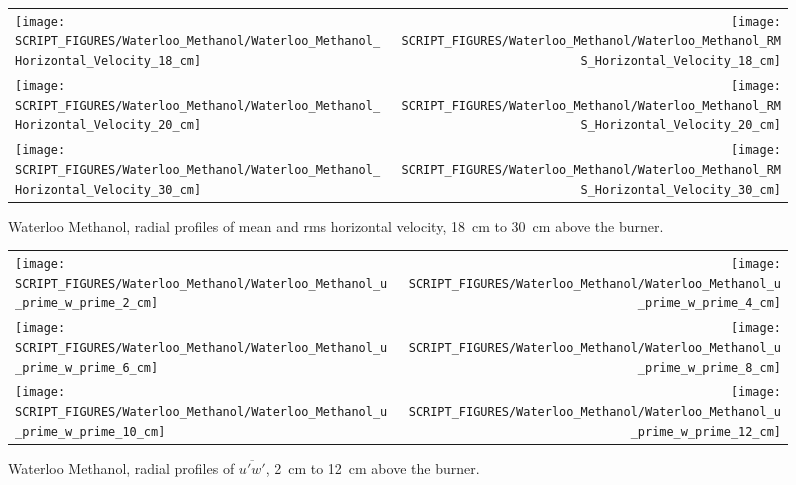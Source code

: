 \begin{figure}[p]
\begin{tabular*}{\textwidth}{l@{\extracolsep{\fill}}r}
\texttt{[image: SCRIPT\_FIGURES/Waterloo\_Methanol/Waterloo\_Methanol\_Horizontal\_Velocity\_18\_cm]} &
\texttt{[image: SCRIPT\_FIGURES/Waterloo\_Methanol/Waterloo\_Methanol\_RMS\_Horizontal\_Velocity\_18\_cm]} \\
\texttt{[image: SCRIPT\_FIGURES/Waterloo\_Methanol/Waterloo\_Methanol\_Horizontal\_Velocity\_20\_cm]} &
\texttt{[image: SCRIPT\_FIGURES/Waterloo\_Methanol/Waterloo\_Methanol\_RMS\_Horizontal\_Velocity\_20\_cm]} \\
\texttt{[image: SCRIPT\_FIGURES/Waterloo\_Methanol/Waterloo\_Methanol\_Horizontal\_Velocity\_30\_cm]} &
\texttt{[image: SCRIPT\_FIGURES/Waterloo\_Methanol/Waterloo\_Methanol\_RMS\_Horizontal\_Velocity\_30\_cm]}
\end{tabular*}
\caption[Waterloo Methanol, radial mean and rms horizontal velocity, 18~cm to 30~cm above burner]
{Waterloo Methanol, radial profiles of mean and rms horizontal velocity, 18~cm to 30~cm above the burner.}
\label{Water_Methanol_Hori_Vel_3}
\end{figure}


\begin{figure}[p]
\begin{tabular*}{\textwidth}{l@{\extracolsep{\fill}}r}
\texttt{[image: SCRIPT\_FIGURES/Waterloo\_Methanol/Waterloo\_Methanol\_u\_prime\_w\_prime\_2\_cm]} &
\texttt{[image: SCRIPT\_FIGURES/Waterloo\_Methanol/Waterloo\_Methanol\_u\_prime\_w\_prime\_4\_cm]} \\
\texttt{[image: SCRIPT\_FIGURES/Waterloo\_Methanol/Waterloo\_Methanol\_u\_prime\_w\_prime\_6\_cm]} &
\texttt{[image: SCRIPT\_FIGURES/Waterloo\_Methanol/Waterloo\_Methanol\_u\_prime\_w\_prime\_8\_cm]} \\
\texttt{[image: SCRIPT\_FIGURES/Waterloo\_Methanol/Waterloo\_Methanol\_u\_prime\_w\_prime\_10\_cm]} &
\texttt{[image: SCRIPT\_FIGURES/Waterloo\_Methanol/Waterloo\_Methanol\_u\_prime\_w\_prime\_12\_cm]}
\end{tabular*}
\caption[Waterloo Methanol, radial profiles of $\overline{u'w'}$, 2~cm to 12~cm above the burner]
{Waterloo Methanol, radial profiles of $\overline{u'w'}$, 2~cm to 12~cm above the burner.}
\label{Water_Methanol_upwp_1}
\end{figure}

